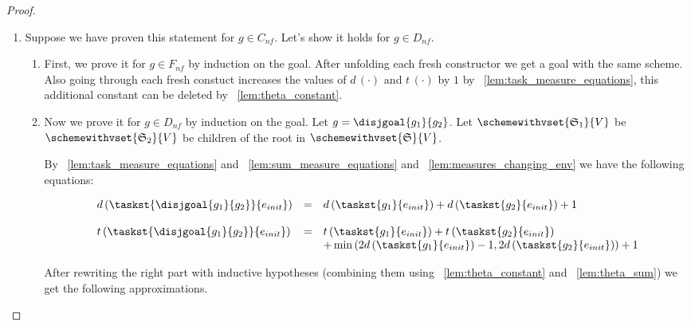 \begin{proof}
$ $\newline
\begin{enumerate}
\item Suppose we have proven this statement for $g \in C_{nf}$. Let's show it holds for $g \in D_{nf}$.
	\begin{enumerate}
	\item First, we prove it for  $g \in F_{nf}$ by induction on the goal.
	After unfolding each fresh constructor we get a goal with the same scheme.	
	Also going through each fresh constuct increases the values of $d\,(\cdot)$ and $t\,(\cdot)$ by $1$ by \lemmaword~\ref{lem:task_measure_equations}, this additional constant can be deleted by \lemmaword~\ref{lem:theta_constant}.
	
	\item Now we prove it for $g \in D_{nf}$ by induction on the goal. Let $g = \disjgoal{g_1}{g_2}$. Let $\schemewithvset{\mathfrak{S}_1}{V}$ be $\schemewithvset{\mathfrak{S}_2}{V}$ be children of the root in $\schemewithvset{\mathfrak{S}}{V}$.
		
	By \lemmaword~\ref{lem:task_measure_equations} and \lemmaword~\ref{lem:sum_measure_equations} and \lemmaword~\ref{lem:measures_changing_env} we have the following equations:

    \[ \begin{array}{lcl}
	d\,(\taskst{\disjgoal{g_1}{g_2}}{e_{init}}) &=& d\,(\taskst{g_1}{e_{init}}) + d\,(\taskst{g_2}{e_{init}}) + 1 \\
	\\
	t\,(\taskst{\disjgoal{g_1}{g_2}}{e_{init}}) &=& t\,(\taskst{g_1}{e_{init}}) + t\,(\taskst{g_2}{e_{init}}) \\
	&& + \min\,(2 d\,(\taskst{g_1}{e_{init}}) - 1, 2 d\,(\taskst{g_2}{e_{init}})) + 1
	\end{array} \]
	
	After rewriting the right part with inductive hypotheses (combining them using \lemmaword~\ref{lem:theta_constant} and \lemmaword~\ref{lem:theta_sum}) we get the following approximations.
	

\end{enumerate}
\end{enumerate}
\end{proof}
